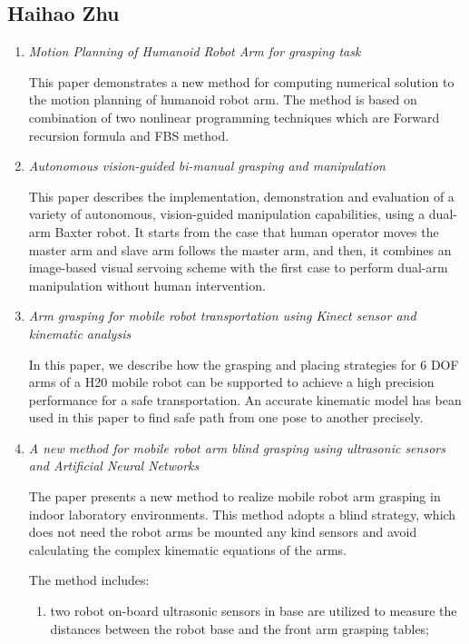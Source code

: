 \documentclass[10pt,twocolumn,letterpaper]{article}
\begin{document}
\subsection{Haihao Zhu}

\begin{enumerate}
\item \textit{Motion Planning of Humanoid Robot Arm for grasping task} \cite{4516345}

This paper demonstrates a new method for computing numerical solution to the motion planning of humanoid robot arm. The method is based on combination of two nonlinear programming techniques which are Forward recursion formula and FBS method. 

\item \textit{Autonomous vision-guided bi-manual grasping and manipulation} \cite{8025192}

This paper describes the implementation, demonstration and evaluation of a variety of autonomous, vision-guided manipulation capabilities, using a dual-arm Baxter robot. It starts from the case that human operator  moves the master arm and slave arm follows the master arm, and then, it combines an image-based visual servoing scheme with the first case to perform dual-arm manipulation without human intervention. 
  
\item \textit{Arm grasping for mobile robot transportation using Kinect sensor and kinematic analysis} \cite{7151321}

In this paper, we describe how the grasping and placing strategies for 6 DOF arms of a H20 mobile robot can be supported to achieve a high precision performance for a safe transportation. An accurate kinematic model has bean used in this paper to find safe path from one pose to another precisely.

\item \textit{A new method for mobile robot arm blind grasping using ultrasonic sensors and Artificial Neural Networks} \cite{6739654}

The paper presents a new method to realize mobile robot arm grasping in indoor laboratory environments. This
method adopts a blind strategy, which does not need the robot arms be mounted any kind sensors and avoid calculating the complex kinematic equations of the arms.

The method includes:
\begin{enumerate}
\item two robot on-board ultrasonic sensors in base are utilized to measure the distances between the robot base and the front arm grasping tables; 


\end{enumerate}
\end{enumerate}
\end{document}
